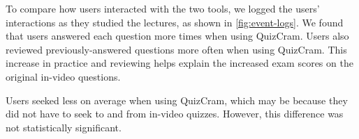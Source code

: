 \documentclass{sigchi}
\begin{document}

To compare how users interacted with the two tools, we logged the users' interactions as they studied the lectures, as shown in \autoref{fig:event-logs}. We found that users answered each question more times when using QuizCram. Users also reviewed previously-answered questions more often when using QuizCram. This increase in practice and reviewing helps explain the increased exam scores on the original in-video questions. %



Users seeked less on average when using QuizCram, which may be because they did not have to seek to and from in-video quizzes. However, this difference was not statistically significant.


\end{document}
